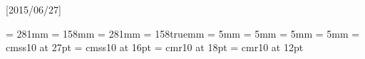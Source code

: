 
\beginpackages
  \usepackage{url}[2015/06/27]
  \usepackage[dvipsnames]{color}
  \usepackage{graphicx}
\endpackages
\enablehyperlinks
{}
\paperwidth = 281mm
\paperheight = 158mm
\pdfpagewidth = 281mm
\pdfpageheight = 158truemm
\topmargin = 5mm
\bottommargin = 5mm
\leftmargin = 5mm
\rightmargin = 5mm
\font\titlefont  = cmss10 at 27pt
\font\authorfont = cmss10 at 16pt
\font\topicfont  = cmr10 at 18pt
\font\textfont   = cmr10 at 12pt

\def\header{%
    {\kern-2in{\color{mycolor}\vrule width 100cm height 1.8cm}}
}

\newcount\fignumber
\newbox\imgbox

\def\cfig#1#2#3#4{%
\global\advance\fignumber by 1
\pdfximage width #4{#2}
\centerline{\pdfrefximage\pdflastximage}
\hldesttype[definexref]{fitr}%
\hldestopts[definexref]{width=\wd\imgbox,height=0pt,depth=\ht\imgbox}%
\definexref{#1}{Fig. \the\fignumber}{figure}%
\centerline{\color{mycolor}\noindent Fig.~\the\fignumber.\ #3\color{black}}%
}

\def\lfig#1#2#3#4{%
\global\advance\fignumber by 1
\pdfximage width #4{#2}
\pdfrefximage\pdflastximage
\hldesttype[definexref]{fitr}%
\hldestopts[definexref]{width=\wd\imgbox,height=0pt,depth=\ht\imgbox}%
\definexref{#1}{Fig. \the\fignumber}{figure}%
\color{mycolor}\noindent Fig.~\the\fignumber.\ #3\color{black}%
}

\def\numberedprintmarker#1{\llap{#1. \listmarkerspace}}%
